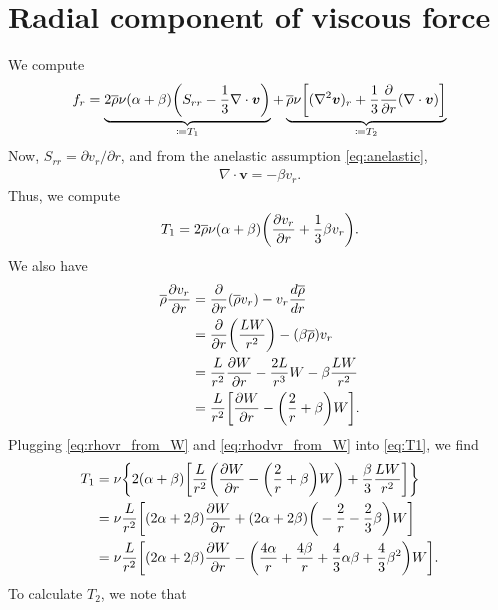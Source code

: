 \documentclass[12pt]{article} %
\newcommand{\pderiv}[2]{\frac{\partial#1}{\partial#2}}
\newcommand{\rhobar}{\overline{\rho}}
\newcommand{\Div}{\nabla\cdot}
\begin{document}
	\section{Radial component of viscous force}
	We compute 
	\begin{align}
	f_r = \underbrace{2\rhobar\nu(\alpha+\beta)\bigg{(}S_{rr} - \frac{1}{3}\Div\bm{v}\bigg{)}}_{\coloneqq T_1} + \underbrace{\rhobar\nu\bigg{[}(\nabla^2\bm{v})_r + \frac{1}{3}\pderiv{}{r}(\nabla\cdot\bm{v})\bigg{]}}_{\coloneqq T_2}
	\label{eq:fr_twoterms}
	\end{align}
	Now, $S_{rr}=\partial v_r/\partial r$, and from the anelastic assumption \eqref{eq:anelastic},
	 \begin{align}
	 \Div\bm{v}=-\beta v_r.
	 \label{eq:divv_from_vr}
	 \end{align}
	 Thus, we compute
	\begin{align}
	T_1 = 2\rhobar\nu(\alpha+\beta)\bigg{(}\pderiv{v_r}{r}+\frac{1}{3}\beta v_r\bigg{)}.
	\label{eq:T1}
	\end{align}
	We also have 
	\begin{align}
	\rhobar\pderiv{v_r}{r} &= \pderiv{}{r}(\rhobar v_r) - v_r\frac{d\rhobar}{dr}\nonumber\\
	&= \pderiv{}{r}\bigg{(}\frac{LW}{r^2}\bigg{)} - (\beta\rhobar)v_r\nonumber\\
	&= \frac{L}{r^2}\pderiv{W}{r} - \frac{2L}{r^3}W - \beta\frac{LW}{r^2}\nonumber\\
	&= \frac{L}{r^2}\bigg{[}\pderiv{W}{r}-\bigg{(}\frac{2}{r}+\beta\bigg{)}W\bigg{]}.
	\label{eq:rhodvr_from_W}
	\end{align}
	Plugging \eqref{eq:rhovr_from_W} and \eqref{eq:rhodvr_from_W} into \eqref{eq:T1}, we find
	\begin{align}
	T_1 &= \nu\bigg{\{}2(\alpha+\beta)\bigg{[}\frac{L}{r^2}\bigg{(}\pderiv{W}{r} - \bigg{(}\frac{2}{r}+\beta\bigg{)}W\bigg{)}+\frac{\beta}{3}\frac{LW}{r^2}\bigg{]}\bigg{\}}\nonumber\\
	&= \nu\frac{L}{r^2}\bigg{[}(2\alpha+2\beta)\pderiv{W}{r} + (2\alpha+2\beta)\bigg{(}-\frac{2}{r}-\frac{2}{3}\beta\bigg{)}W\bigg{]}\nonumber\\
	&= \nu\frac{L}{r^2}\bigg{[}(2\alpha+2\beta)\pderiv{W}{r} - \bigg{(}\frac{4\alpha}{r}+\frac{4\beta}{r} + \frac{4}{3}\alpha\beta + \frac{4}{3}\beta^2\bigg{)}W\bigg{]}.
	\label{eq:t1_resolved}
	\end{align}
	To calculate $T_2$, we note that
\end{document}
